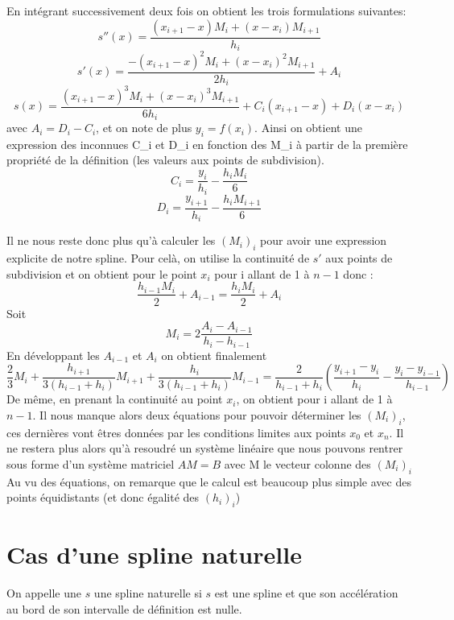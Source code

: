 En intégrant successivement deux fois on obtient les trois formulations suivantes:
\[
s''(x) = \frac{(x_{i+1} - x)M_i + (x - x_i)M_{i+1}}{h_i}
\]
\[
s'(x) = \frac{-(x_{i+1} - x)^{2}M_i + (x - x_i)^{2}M_{i+1}}{2h_i} + A_i
\]
\[
s(x) = \frac{(x_{i+1} - x)^{3}M_i + (x - x_i)^{3}M_{i+1}}{6h_i} + C_i(x_{i+1}-x) +D_i(x-x_i)
\]
avec $A_i = D_i - C_i$, et on note de plus $y_i = f(x_i)$. Ainsi on obtient une expression des inconnues C_i et D_i
en fonction des M_i à partir de la première propriété de la définition (les valeurs aux points de subdivision).
\[
C_i = \frac{y_i}{h_i} - \frac{h_iM_i}{6}
\]
\[
D_i = \frac{y_{i+1}}{h_i} - \frac{h_iM_{i+1}}{6}
\]

Il ne nous reste donc plus qu'à calculer les $(M_i)_i$ pour avoir une expression explicite de notre spline.
Pour celà, on utilise la continuité de $s'$ aux points de subdivision et on obtient pour le point $x_{i}$ pour i allant de 1 à $n-1$ donc :
\[
\frac{h_{i-1}M_{i}}{2} + A_{i-1} = \frac{h_{i}M_{i}}{2} + A_{i}
\]
Soit
\[
{M_{i}} = 2\frac{A_{i}-A_{i-1}}{h_{i}-h_{i-1}}
\]
En développant les $A_{i-1}$ et $A_{i}$ on obtient finalement
\[
\frac{2}{3}M_{i} +\frac{h_{i+1}}{3(h_{i-1}+h_{i})}M_{i+1}+\frac{h_{i}}{3(h_{i-1}+h_{i})}M_{i-1} = \frac{2}{h_{i-1}+h_{i}} (\frac{y_{i+1} - y_{i}}{h_{i}} - \frac{y_{i} - y_{i-1}}{h_{i-1}})
\]
De même, en prenant la continuité au point $x_i$, on obtient pour i allant de 1 à $n-1$.
Il nous manque alors deux équations pour pouvoir déterminer les $(M_i)_i$,
ces dernières vont êtres données par les conditions limites aux points $x_0$ et $x_n$.
Il ne restera plus alors qu'à resoudré un système linéaire que nous pouvons rentrer sous forme d'un système matriciel $AM = B$
avec M le vecteur colonne des $(M_i)_i$
Au vu des équations, on remarque que le calcul est beaucoup plus simple avec des points équidistants (et donc égalité des $(h_i)_i$)

\section{Cas d'une spline naturelle}

\begin{definition}
On appelle une $s$ une spline naturelle si $s$ est une spline et que
son accélération au bord de son intervalle de définition est nulle.
\end{definition}

